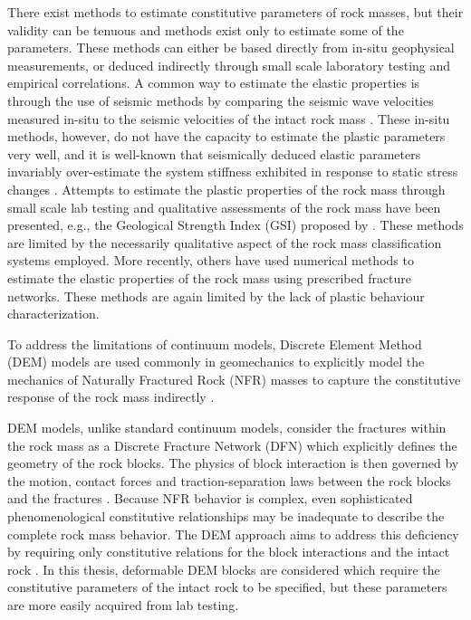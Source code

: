 There exist methods to estimate constitutive parameters of rock masses, but their validity can be tenuous and methods exist only to estimate some of the parameters. These methods can either be based directly from in-situ geophysical measurements, or deduced indirectly through small scale laboratory testing and empirical correlations. A common way to estimate the elastic properties is through the use of seismic methods by comparing the seismic wave velocities measured in-situ to the seismic velocities of the intact rock mass \citep{SJOGREN_1979}. These in-situ methods, however, do not have the capacity to estimate the plastic parameters very well, and it is well-known that seismically deduced elastic parameters invariably over-estimate the system stiffness exhibited in response to static stress changes \citep{Barton_2006}. Attempts to estimate the plastic properties of the rock mass through small scale lab testing and qualitative assessments of the rock mass have been presented, e.g., the Geological Strength Index (GSI) proposed by \citet{Hoek_1997}. These methods are limited by the necessarily qualitative aspect of the rock mass classification systems employed. More recently, others \citep{Min_2003,Chen_2012,Bidgoli_2013} have used numerical methods to estimate the elastic properties of the rock mass using prescribed fracture networks. These methods are again limited by the lack of plastic behaviour characterization. 

To address the limitations of continuum models, Discrete Element Method (DEM) models are used commonly in geomechanics to explicitly model the mechanics of Naturally Fractured Rock (NFR) masses to capture the constitutive response of the rock mass indirectly \citep{jing_review_2003}. 

DEM models, unlike standard continuum models, consider the fractures within the rock mass as a Discrete Fracture Network (DFN) which explicitly defines the geometry of the rock blocks. The physics of block interaction is then governed by the motion, contact forces and traction-separation laws between the rock blocks and the fractures \citep{Thallak_1990}. Because NFR behavior is complex, even sophisticated phenomenological constitutive relationships may be inadequate to describe the complete rock mass behavior. The DEM approach aims to address this deficiency by requiring only constitutive relations for the block interactions and the intact rock \citep{Barbosa_1990}. In this thesis,  deformable DEM blocks are considered which require the constitutive parameters of the intact rock to be specified, but these parameters are more easily acquired from lab testing. 

